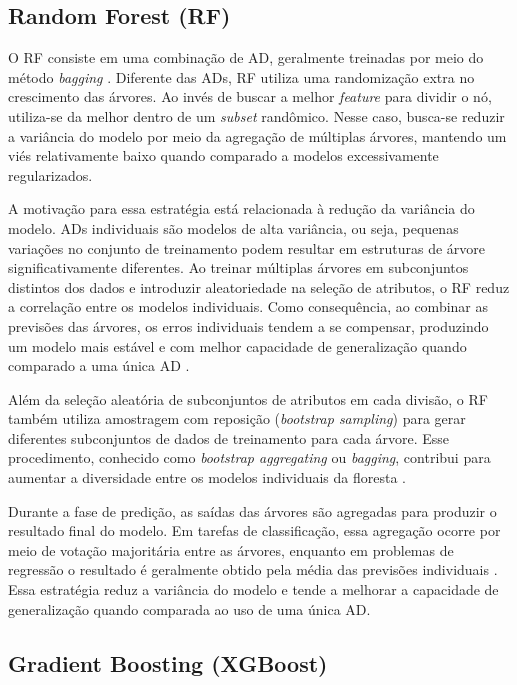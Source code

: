 \subsection{Random Forest (RF)}

O RF consiste em uma combinação de AD, geralmente treinadas por meio do método \textit{bagging} \cite{Geron2019}. Diferente das ADs, RF 
utiliza uma randomização extra no crescimento das árvores. Ao invés de buscar a melhor \textit{feature} para dividir o nó, 
utiliza-se da melhor dentro de um \textit{subset} randômico. Nesse caso, busca-se reduzir a variância do modelo por meio da agregação de 
múltiplas árvores, mantendo um viés relativamente baixo quando comparado a modelos excessivamente regularizados.

A motivação para essa estratégia está relacionada à redução da variância do modelo. ADs individuais são modelos de alta variância, 
ou seja, pequenas variações no conjunto de treinamento podem resultar em estruturas de árvore significativamente diferentes. Ao treinar múltiplas 
árvores em subconjuntos distintos dos dados e introduzir aleatoriedade na seleção de atributos, o RF reduz a correlação entre os modelos 
individuais. Como consequência, ao combinar as previsões das árvores, os erros individuais tendem a se compensar, produzindo um modelo mais estável 
e com melhor capacidade de generalização quando comparado a uma única AD \cite{Geron2019}.

Além da seleção aleatória de subconjuntos de atributos em cada divisão, o RF também utiliza amostragem com reposição (\textit{bootstrap sampling}) para 
gerar diferentes subconjuntos de dados de treinamento para cada árvore. Esse procedimento, conhecido como \textit{bootstrap aggregating} 
ou \textit{bagging}, contribui para aumentar a diversidade entre os modelos individuais da floresta \cite{Geron2019}. 

Durante a fase de predição, as saídas das árvores são agregadas para produzir o resultado final do modelo. Em tarefas de classificação, 
essa agregação ocorre por meio de votação majoritária entre as árvores, enquanto em problemas de regressão o resultado é geralmente obtido pela 
média das previsões individuais \cite{Geron2019}. Essa estratégia reduz a variância do modelo e tende a melhorar a capacidade de generalização quando comparada 
ao uso de uma única AD.

\subsection{Gradient Boosting (XGBoost)}

